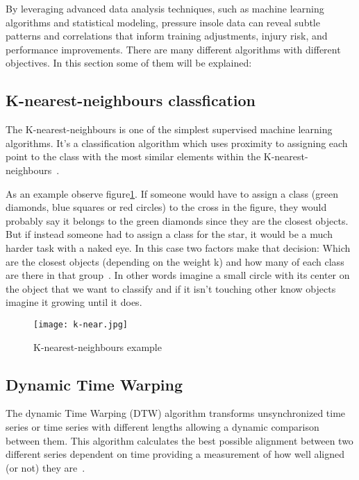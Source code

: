 By leveraging advanced data analysis techniques, such as machine learning algorithms and statistical modeling, pressure insole data can reveal subtle patterns and correlations that 
inform training adjustments, injury risk, and performance improvements. There are many different algorithms with different objectives. In this section some of them will be explained:


\subsection{K-nearest-neighbours classfication}
\label{ssec:k-nearest_neighbours}

The K-nearest-neighbours is one of the simplest supervised machine learning algorithms. It's a classification algorithm which uses proximity to assigning each point to the class with 
the most similar elements within the K-nearest-neighbours~\cite{bachelorInsole, porto}. 

As an example observe figure\ref{fig:k-near}. If someone would have to assign a class (green diamonds, blue squares or red circles) to the cross in the figure, they would probably say it belongs to the green diamonds since 
they are the closest objects. But if instead someone had to assign a class for the star, it would be a much harder task with a naked eye. 
In this case two factors make that decision: Which are the closest objects (depending on the weight k) and how many of each class are there in that group~\cite{bachelorInsole}. In other words 
imagine a small circle with its center on the object that we want to classify and if it isn't touching other know objects imagine it growing until it does.

\begin{figure}[htbp]
  \centering
  \texttt{[image: k-near.jpg]}
  \caption{K-nearest-neighbours example~\cite{bachelorInsole}}
  \label{fig:k-near}
\end{figure}

\subsection{Dynamic Time Warping}
\label{ssec:dynamic_time_warping}

The dynamic Time Warping (DTW) algorithm transforms unsynchronized time series or time series with different lengths allowing a dynamic comparison between them. This algorithm calculates 
the best possible alignment between two different series dependent on time providing a measurement of how well aligned (or not) they are~\cite{bachelorInsole}.


